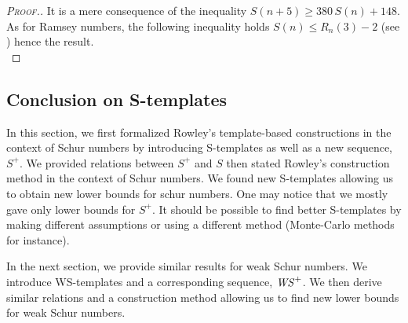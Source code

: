 \begin{proof}[\textsc{Proof.}]
It is a mere consequence of the inequality \( S(n+5) \geqslant 380 \, S(n) + 148\). As for Ramsey
numbers, the following inequality holds \(S(n) \leqslant R_n(3) - 2\) (see \cite{AbbottHanson}) hence the result. \\
\end{proof}


\subsection{Conclusion on S-templates}

\qquad In this section, we first formalized Rowley's template-based constructions \cite{RowleyRamsey} in the context of Schur numbers 
by introducing S-templates as well as a new sequence, \(S^+\). We provided relations between \(S^+\) and \(S\) then 
stated Rowley's construction method in the context of Schur numbers. We found new S-templates allowing us to obtain 
new lower bounds for schur numbers. One may notice that we mostly gave only lower bounds for \(S^+\). It should be possible to 
find better S-templates by making different assumptions or using a different method (Monte-Carlo methods for instance).

\par
In the next section, we provide similar results for weak Schur numbers. We introduce WS-templates and a corresponding sequence, 
\(\mathit{WS}^+\). We then derive similar relations and a construction method allowing us to find new lower bounds for weak Schur numbers.